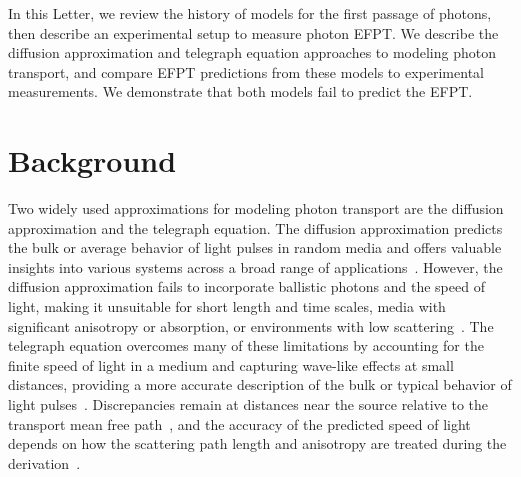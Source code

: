 In this Letter, we review the history of models for the first passage of photons, then describe an experimental setup to measure photon EFPT. We describe the diffusion approximation and telegraph equation approaches to modeling photon transport, and compare EFPT predictions from these models to experimental measurements. We demonstrate that both models fail to predict the EFPT.

\section{Background}

Two widely used approximations for modeling photon transport are the diffusion approximation and the telegraph equation. The diffusion approximation predicts the bulk or average behavior of light pulses in random media and offers valuable insights into various systems across a broad range of applications~\cite{haskell_boundary_1994,  chandrasekhar_stochastic_1943,chandrasekhar_radiative_1950,  brown_light_1975, allgaier_diffuse_2021, taitelbaum_diagnosis_1999, amendola_accuracy_2021}. However, the diffusion approximation fails to incorporate ballistic photons and the speed of light, making it unsuitable for short length and time scales, media with significant anisotropy or absorption, or environments with low scattering~\cite{ishimaru_wave_1997, yoo_time-resolved_1990, yoo_when_1990, durian_photon_1997, zhang_wave_2002, pierrat_photon_2006}. The telegraph equation overcomes many of these limitations by accounting for the finite speed of light in a medium and capturing wave-like effects at small distances, providing a more accurate description of the bulk or typical behavior of light pulses~\cite{goldstein_diffusion_1951, durian_two-stream_1996, durian_photon_1997, lemieux_diffusing-light_1998, masoliver_solutions_1992, masoliver_finite-velocity_1996, das_non-fickian_1998, polishchuk_photon-density_1997}. Discrepancies remain at distances near the source relative to the transport mean free path~\cite{durian_photon_1997, dudko_photon_2005, lemieux_diffusing-light_1998}, and the accuracy of the predicted speed of light depends on how the scattering path length and anisotropy are treated during the derivation~\cite{ heizler_asymptotic_2012, hoenders_telegraphers_2005, polishchuk_photon-density_1997}.

